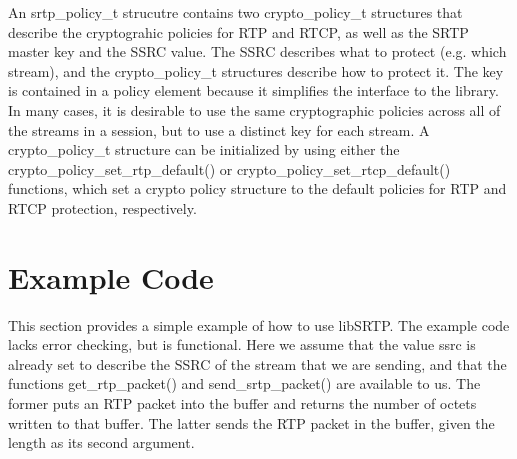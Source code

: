 An srtp\_\-policy\_\-t strucutre contains two crypto\_\-policy\_\-t structures that describe the cryptograhic policies for RTP and RTCP, as well as the SRTP master key and the SSRC value. The SSRC describes what to protect (e.g. which stream), and the crypto\_\-policy\_\-t structures describe how to protect it. The key is contained in a policy element because it simplifies the interface to the library. In many cases, it is desirable to use the same cryptographic policies across all of the streams in a session, but to use a distinct key for each stream. A crypto\_\-policy\_\-t structure can be initialized by using either the crypto\_\-policy\_\-set\_\-rtp\_\-default() or crypto\_\-policy\_\-set\_\-rtcp\_\-default() functions, which set a crypto policy structure to the default policies for RTP and RTCP protection, respectively.\hypertarget{main_Example}{}\section{Example Code}\label{main_Example}
This section provides a simple example of how to use libSRTP. The example code lacks error checking, but is functional. Here we assume that the value ssrc is already set to describe the SSRC of the stream that we are sending, and that the functions get\_\-rtp\_\-packet() and send\_\-srtp\_\-packet() are available to us. The former puts an RTP packet into the buffer and returns the number of octets written to that buffer. The latter sends the RTP packet in the buffer, given the length as its second argument.

